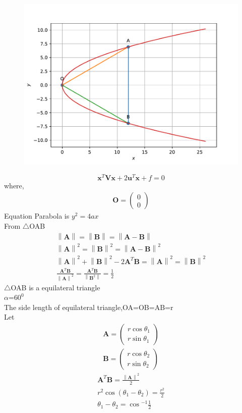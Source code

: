 \documentclass[journal,10pt,twocolumn]{article}
\providecommand{\norm}[1]{\left\lVert#1\right\rVert}
\let\vec\mathbf
\newcommand{\myvec}[1]{\ensuremath{\begin{pmatrix}#1\end{pmatrix}}}
\begin{document}
\begin{figure}[h]
\includegraphics[width=0.8\columnwidth]{figs/co.pdf}
\end{figure}
\begin{equation}
  \label{eq:std_parabola}
  \textbf{x}^T\textbf{V}\textbf{x}+2\textbf{u}^T\textbf{x}+f=0
\end{equation}
where,
\begin{eqnarray}
	\vec{O}=\myvec{0\\0}
\end{eqnarray}	
Equation Parabola is $y^2=4ax$\\
From $\triangle$OAB
\begin{eqnarray}
	\norm{\vec{A}}=\norm{\vec{B}}=\norm{\vec{A-B}}\\
	\norm{\vec{A}}^2=\norm{\vec{B}}^2=\norm{\vec{A-B}}^2\\
	\norm{\vec{A}}^2+\norm{\vec{B}}^2-2\vec{A}^T\vec{B}=\norm{\vec{A}}^2=\norm{\vec{B}}^2\\
	\frac{\vec{A}^T\vec{B}}{\norm{\vec{A}}^2}=\frac{\vec{A}^T\vec{B}}{\norm{\vec{B}^2}}=\frac{1}{2}
\end{eqnarray}
$\triangle$OAB is a equilateral triangle\\
$\alpha$=$60^{0}$\\
The side length of equilateral triangle,OA=OB=AB=r\\
Let
\begin{eqnarray}
	\vec{A}=\myvec{r\cos{\theta_1}\\r\sin{\theta_1}}\\
	\vec{B}=\myvec{r\cos{\theta_2}\\r\sin{\theta_2}}
\end{eqnarray}
\begin{eqnarray}
	\vec{A}^T\vec{B}=\frac{\norm{\vec{A}}^2}{2}\\
	r^2\cos{(\theta_1-\theta_2)}=\frac{r^2}{2}\\
	\theta_1-\theta_2=\cos{^{-1}\frac{1}{2}}
\end{eqnarray}
\end{document}
